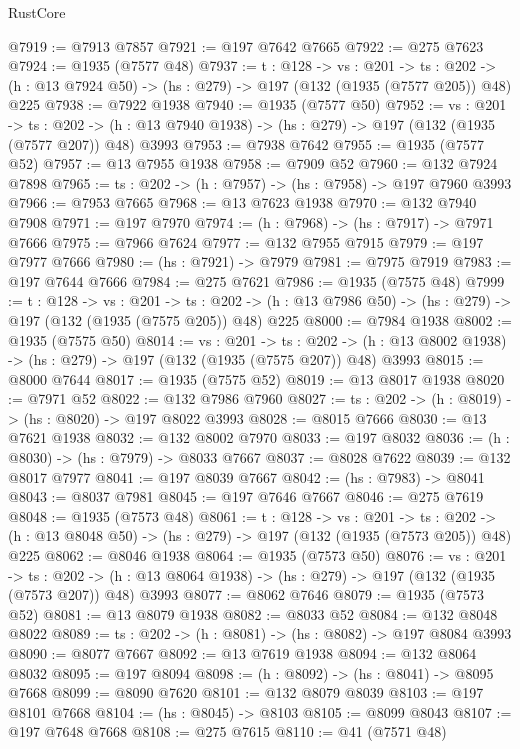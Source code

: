 \begin{lexlean}{RustCore}
\begin{coremodule}
@7919 := @7913 @7857
@7921 := @197 @7642 @7665
@7922 := @275 @7623
@7924 := @1935 (@7577 @48)
@7937 := {t : @128} ->
  {vs : @201} ->
  {ts : @202} -> (h : @13 @7924 @50) -> (hs : @279) -> @197 (@132 (@1935 (@7577 @205)) @48) @225
@7938 := @7922 @1938
@7940 := @1935 (@7577 @50)
@7952 := {vs : @201} ->
  {ts : @202} -> (h : @13 @7940 @1938) -> (hs : @279) -> @197 (@132 (@1935 (@7577 @207)) @48) @3993
@7953 := @7938 @7642
@7955 := @1935 (@7577 @52)
@7957 := @13 @7955 @1938
@7958 := @7909 @52
@7960 := @132 @7924 @7898
@7965 := {ts : @202} -> (h : @7957) -> (hs : @7958) -> @197 @7960 @3993
@7966 := @7953 @7665
@7968 := @13 @7623 @1938
@7970 := @132 @7940 @7908
@7971 := @197 @7970
@7974 := (h : @7968) -> (hs : @7917) -> @7971 @7666
@7975 := @7966 @7624
@7977 := @132 @7955 @7915
@7979 := @197 @7977 @7666
@7980 := (hs : @7921) -> @7979
@7981 := @7975 @7919
@7983 := @197 @7644 @7666
@7984 := @275 @7621
@7986 := @1935 (@7575 @48)
@7999 := {t : @128} ->
  {vs : @201} ->
  {ts : @202} -> (h : @13 @7986 @50) -> (hs : @279) -> @197 (@132 (@1935 (@7575 @205)) @48) @225
@8000 := @7984 @1938
@8002 := @1935 (@7575 @50)
@8014 := {vs : @201} ->
  {ts : @202} -> (h : @13 @8002 @1938) -> (hs : @279) -> @197 (@132 (@1935 (@7575 @207)) @48) @3993
@8015 := @8000 @7644
@8017 := @1935 (@7575 @52)
@8019 := @13 @8017 @1938
@8020 := @7971 @52
@8022 := @132 @7986 @7960
@8027 := {ts : @202} -> (h : @8019) -> (hs : @8020) -> @197 @8022 @3993
@8028 := @8015 @7666
@8030 := @13 @7621 @1938
@8032 := @132 @8002 @7970
@8033 := @197 @8032
@8036 := (h : @8030) -> (hs : @7979) -> @8033 @7667
@8037 := @8028 @7622
@8039 := @132 @8017 @7977
@8041 := @197 @8039 @7667
@8042 := (hs : @7983) -> @8041
@8043 := @8037 @7981
@8045 := @197 @7646 @7667
@8046 := @275 @7619
@8048 := @1935 (@7573 @48)
@8061 := {t : @128} ->
  {vs : @201} ->
  {ts : @202} -> (h : @13 @8048 @50) -> (hs : @279) -> @197 (@132 (@1935 (@7573 @205)) @48) @225
@8062 := @8046 @1938
@8064 := @1935 (@7573 @50)
@8076 := {vs : @201} ->
  {ts : @202} -> (h : @13 @8064 @1938) -> (hs : @279) -> @197 (@132 (@1935 (@7573 @207)) @48) @3993
@8077 := @8062 @7646
@8079 := @1935 (@7573 @52)
@8081 := @13 @8079 @1938
@8082 := @8033 @52
@8084 := @132 @8048 @8022
@8089 := {ts : @202} -> (h : @8081) -> (hs : @8082) -> @197 @8084 @3993
@8090 := @8077 @7667
@8092 := @13 @7619 @1938
@8094 := @132 @8064 @8032
@8095 := @197 @8094
@8098 := (h : @8092) -> (hs : @8041) -> @8095 @7668
@8099 := @8090 @7620
@8101 := @132 @8079 @8039
@8103 := @197 @8101 @7668
@8104 := (hs : @8045) -> @8103
@8105 := @8099 @8043
@8107 := @197 @7648 @7668
@8108 := @275 @7615
@8110 := @41 (@7571 @48)

\end{coremodule}
\end{lexlean}
